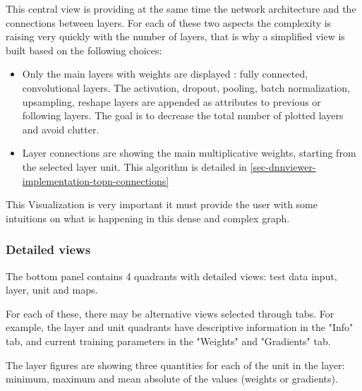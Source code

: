This central view is providing at the same time the network architecture and the connections between layers. For each of these two aspects the complexity is raising very quickly with the number of layers, that is why a simplified view is built based on the following choices:
\begin{itemize}
    \item Only the main layers with weights are displayed : fully connected, convolutional layers. The activation, dropout, pooling, batch normalization, upsampling, reshape layers are appended as attributes to previous or following layers. The goal is to decrease the total number of plotted layers and avoid clutter.
    \item Layer connections are showing the main multiplicative weights, starting from the selected layer unit. This algorithm is detailed in \ref{sec-dnnviewer-implementation-topn-connections}
\end{itemize}

This Visualization is very important it must provide the user with some intuitions on what is happening in this dense and complex graph.

\subsubsection{Detailed views}

The bottom panel contains 4 quadrants with detailed views: test data input, layer, unit and maps.

For each of these, there may be alternative views selected through tabs. For example, the layer and unit quadrants have descriptive information in the "Info" tab, and current training parameters in the "Weights" and "Gradients" tab. 

The layer figures are showing three quantities for each of the unit in the layer: minimum, maximum and mean absolute of the values (weights or gradients).

